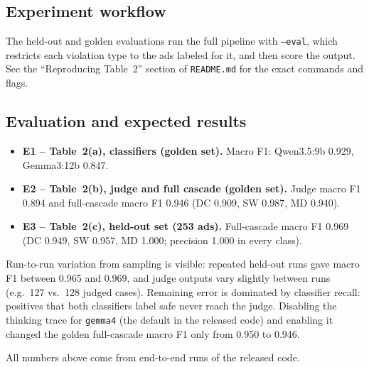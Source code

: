 \documentclass[sigconf,nonacm]{acmart}
\begin{document}
\subsection{Experiment workflow}
The held-out and golden evaluations run the full pipeline with \texttt{--eval}, which restricts each
violation type to the ads labeled for it, and then score the output.
See the ``Reproducing Table~2'' section of \texttt{README.md} for the exact commands and flags.

\subsection{Evaluation and expected results}
\begin{itemize}
  \item \textbf{E1 -- Table~2(a), classifiers (golden set).} Macro F1: Qwen3.5:9b 0.929, Gemma3:12b 0.847.
  \item \textbf{E2 -- Table~2(b), judge and full cascade (golden set).} Judge macro F1 0.894 and full-cascade macro F1 0.946 (DC 0.909, SW 0.987, MD 0.940).
  \item \textbf{E3 -- Table~2(c), held-out set (253 ads).} Full-cascade macro F1 0.969 (DC 0.949, SW 0.957, MD 1.000; precision 1.000 in every class).
\end{itemize}
Run-to-run variation from sampling is visible: repeated held-out runs gave macro F1 between 0.965 and 0.969,
and judge outputs vary slightly between runs (e.g.\ 127 vs.\ 128 judged cases).
Remaining error is dominated by classifier recall: positives that both classifiers label safe never reach the judge.
Disabling the thinking trace for \texttt{gemma4} (the default in the released code) and enabling it changed the golden
full-cascade macro F1 only from 0.950 to 0.946.

All numbers above come from end-to-end runs of the released code.
\end{document}
